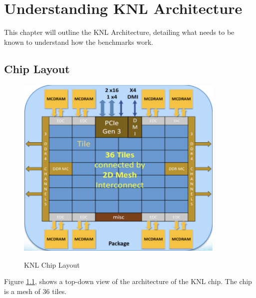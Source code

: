 \documentclass[bsc,frontabs,twoside,singlespacing,parskip,deptreport]{infthesis}     %
\begin{document}
\chapter{Understanding KNL Architecture}\label{chap:knl-arch}
This chapter will outline the KNL Architecture, detailing what needs to be known to understand how the benchmarks work.
\section{Chip Layout}
\begin{figure}[h]
    \includegraphics[width=10cm]{KNL_Overview.png}
    \centering
    \caption{KNL Chip Layout}
    \protect\cite{intel_pres}
    \label{fig:chip-overview}
\end{figure}
Figure \ref{fig:chip-overview}, shows a top-down view of the architecture of the KNL chip. The chip is a mesh of 36 tiles.
\end{document}
